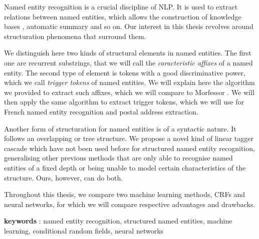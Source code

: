 \documentclass[PhD-Yoann-Dupont.tex]{subfiles}
\begin{document}
Named entity recognition is a crucial discipline of NLP. It is used to extract relations between named entities, which allows the construction of knowledge bases \citep{surdeanu2014overview}, automatic summary \citep{nobata2002summarization} and so on. Our interest in this thesis revolves around structuration phenomena that surround them.

We distinguish here two kinds of structural elements in named entities. The first one are recurrent substrings, that we will call the \emph{caracteristic affixes} of a named entity. The second type of element is tokens with a good discriminative power, which we call \emph{trigger tokens} of named entities. We will explain here the algorithm we provided to extract such affixes, which we will compare to Morfessor \citep{creutz2005unsupervised}. We will then apply the same algorithm to extract trigger tokens, which we will use for French named entity recognition and postal address extraction.

Another form of structuration for named entities is of a syntactic nature. It follows an overlapping or tree structure. We propose a novel kind of linear tagger cascade which have not been used before for structured named entity recognition, generalising other previous methods that are only able to recognise named entities of a fixed depth or being unable to model certain characteristics of the structure. Ours, however, can do both.

Throughout this thesis, we compare two machine learning methods, CRFs and neural networks, for which we will compare respective advantages and drawbacks.

\begin{flushleft}
\textbf{keywords} : named entity recognition, structured named entities, machine learning, conditional random fields, neural networks
\end{flushleft}
\end{document}
